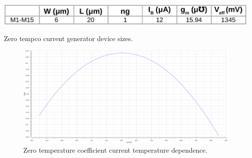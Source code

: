 \documentclass[12pt,oneside,final]{siuethesis}
\theoremstyle{definition}
\begin{document}
\begin{table}[htbp!]
 \centering
 \includegraphics[scale=.35,keepaspectratio=true]{./ch3_figures/ztc_sizes.png}
 \caption{Zero tempco current generator device sizes.}
 \label{tab:ztc-sizes}
\end{table}

\begin{figure}[htbp!]
\centering
\includegraphics[scale=.4, keepaspectratio=true, angle = 90]{../data/ztc.png} 
\caption{Zero temperature coefficient current temperature dependence.}
\label{fig:ztc-temp}
\end{figure}
\end{document}
